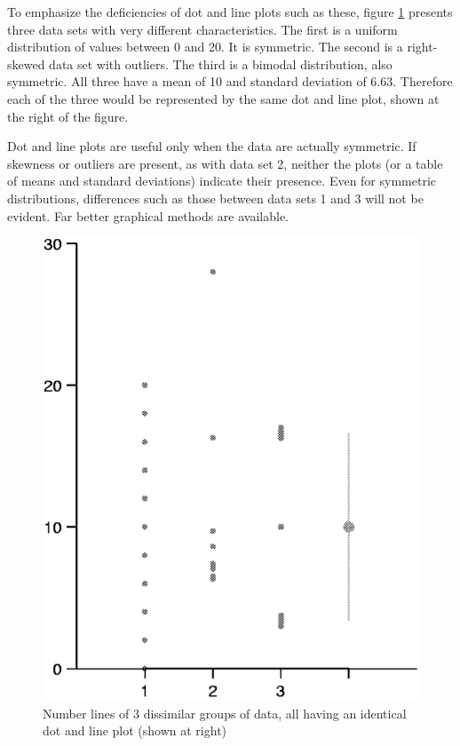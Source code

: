 \documentclass[]{book}
\begin{document}
To emphasize the deficiencies of dot and line plots such as these, figure \ref{fig:fig-2-18} presents three data sets with very different characteristics. The first is a uniform distribution of values between 0 and 20. It is symmetric. The second is a right-skewed data set with outliers. The third is a bimodal distribution, also symmetric. All three have a mean of 10 and standard deviation of 6.63. Therefore each of the three would be represented by the same dot and line plot, shown at the right of the figure.

Dot and line plots are useful only when the data are actually symmetric. If skewness or outliers are present, as with data set 2, neither the plots (or a table of means and standard deviations) indicate their presence. Even for symmetric distributions, differences such as those between data sets 1 and 3 will not be evident. Far better graphical methods are available.

\begin{figure}

{\centering \includegraphics[width=9.36in]{figures/2_18} 

}

\caption{Number lines of 3 dissimilar groups of data, all having an identical dot and line plot (shown at right)}\label{fig:fig-2-18}
\end{figure}
\end{document}
